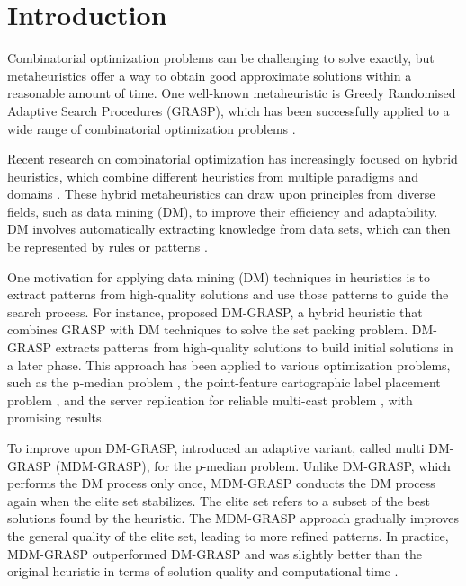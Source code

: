 \documentclass{singlecol-new}
\begin{document}
\maketitle

\section{Introduction}
\label{sec:intro}

Combinatorial optimization problems can be challenging to solve exactly, but metaheuristics offer a way to obtain good approximate solutions within a reasonable amount of time. One well-known metaheuristic is Greedy Randomised Adaptive Search Procedures (GRASP), which has been successfully applied to a wide range of combinatorial optimization problems \cite{resende2019greedy, rezki2018lambda, climaco2022hybrid, garcia2021tactical}.

Recent research on combinatorial optimization has increasingly focused on hybrid heuristics, which combine different heuristics from multiple paradigms and domains \cite{talbi2009metaheuristics, kande2019lagrangian, zandkarimkhani2020sustainable, faraji2018bi}. These hybrid metaheuristics can draw upon principles from diverse fields, such as data mining (DM), to improve their efficiency and adaptability. DM involves automatically extracting knowledge from data sets, which can then be represented by rules or patterns \cite{han2011data}.

One motivation for applying data mining (DM) techniques in heuristics is to extract patterns from high-quality solutions and use those patterns to guide the search process. For instance, \citet{ribeiro06} proposed DM-GRASP, a hybrid heuristic that combines GRASP with DM techniques to solve the set packing problem. DM-GRASP extracts patterns from high-quality solutions to build initial solutions in a later phase. This approach has been applied to various optimization problems, such as the p-median problem \cite{plastino2011hybrid}, the point-feature cartographic label placement problem \cite{guerine2020hybrid}, and the server replication for reliable multi-cast problem \cite{santos2006ngl01}, with promising results.

To improve upon DM-GRASP, \citet{plastino2011hybrid} introduced an adaptive variant, called multi DM-GRASP (MDM-GRASP), for the p-median problem. Unlike DM-GRASP, which performs the DM process only once, MDM-GRASP conducts the DM process again when the elite set stabilizes. The elite set refers to a subset of the best solutions found by the heuristic. The MDM-GRASP approach gradually improves the general quality of the elite set, leading to more refined patterns. In practice, MDM-GRASP outperformed DM-GRASP and was slightly better than the original heuristic in terms of solution quality and computational time \cite{plastino2014adaptive}.
\end{document}
